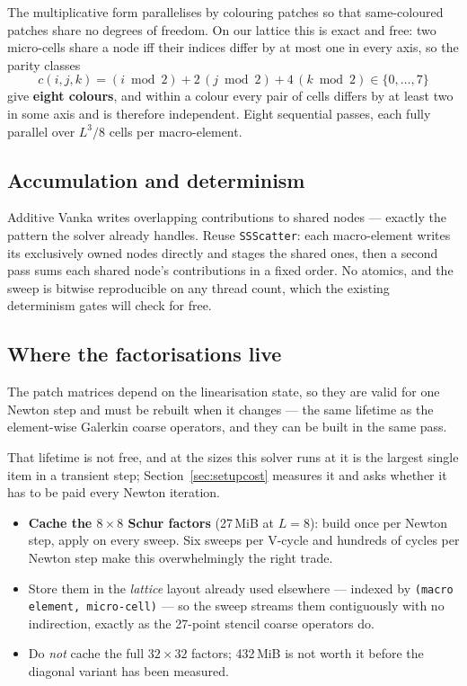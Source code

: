 \documentclass[11pt,a4paper]{article}
\newcommand{\code}[1]{\texttt{\small #1}}
\begin{document}
The multiplicative form parallelises by colouring patches so that same-coloured patches share
no degrees of freedom. On our lattice this is exact and free: two micro-cells share a node iff
their indices differ by at most one in every axis, so the parity classes
\begin{equation}
c(i,j,k) = (i \bmod 2) + 2\,(j \bmod 2) + 4\,(k \bmod 2) \in \{0,\dots,7\}
\end{equation}
give \textbf{eight colours}, and within a colour every pair of cells differs by at least two in
some axis and is therefore independent. Eight sequential passes, each fully parallel over
$L^3/8$ cells per macro-element.

\subsection{Accumulation and determinism}
Additive Vanka writes overlapping contributions to shared nodes --- exactly the pattern the
solver already handles. Reuse \code{SSScatter}: each macro-element writes its exclusively owned
nodes directly and stages the shared ones, then a second pass sums each shared node's
contributions in a fixed order. No atomics, and the sweep is bitwise reproducible on any thread
count, which the existing determinism gates will check for free.

\subsection{Where the factorisations live}
The patch matrices depend on the linearisation state, so they are valid for one Newton step and
must be rebuilt when it changes --- the same lifetime as the element-wise Galerkin coarse
operators, and they can be built in the same pass.

That lifetime is not free, and at the sizes this solver runs at it is the largest single item in
a transient step; Section~\ref{sec:setupcost} measures it and asks whether it has to be paid
every Newton iteration.

\begin{itemize}[leftmargin=*]
\item \textbf{Cache the $8\times8$ Schur factors} (27\,MiB at $L=8$): build once per Newton
step, apply on every sweep. Six sweeps per V-cycle and hundreds of cycles per Newton step make
this overwhelmingly the right trade.
\item Store them in the \emph{lattice} layout already used elsewhere --- indexed by
\code{(macro element, micro-cell)} --- so the sweep streams them contiguously with no
indirection, exactly as the 27-point stencil coarse operators do.
\item Do \emph{not} cache the full $32\times32$ factors; 432\,MiB is not worth it before the
diagonal variant has been measured.
\end{itemize}
\end{document}
